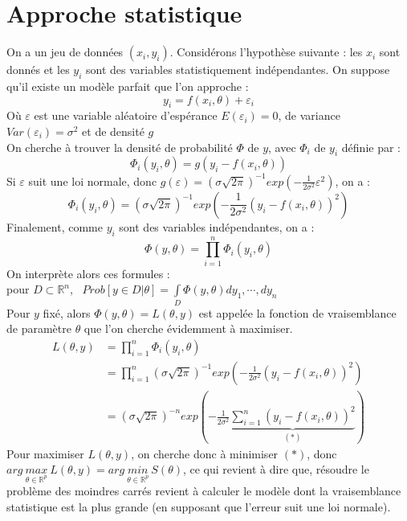 \documentclass[a4paper,10pt]{report}
\begin{document}
\section{Approche statistique}
On a un jeu de données $(x_i,y_i)$. Considérons l'hypothèse suivante : les $x_i$ sont donnés et les $y_i$ sont des variables statistiquement indépendantes. On suppose qu'il existe un modèle parfait que l'on approche :
\begin{displaymath}
y_i = f(x_i, \theta) + \varepsilon_i
\end{displaymath}
Où $\varepsilon$ est une variable aléatoire d'espérance $E(\varepsilon_i)=0$, de variance $Var(\varepsilon_i)=\sigma^2$ et de densité $g$\\
On cherche à trouver la densité de probabilité $\Phi$ de $y$, avec $\Phi_i$ de $y_i$  définie par :
\begin{displaymath}
\Phi_i(y_i, \theta)=g(y_i - f(x_i,\theta))
\end{displaymath}
Si $\varepsilon$ suit une loi normale, donc $g(\varepsilon)=(\sigma \sqrt{2\pi})^{-1}exp\left( -\frac{1}{2\sigma^2} \varepsilon^2 \right)$, on a :\\
\begin{displaymath}
\Phi_i(y_i, \theta)=(\sigma \sqrt{2\pi})^{-1}exp\left( -\frac{1}{2\sigma^2} (y_i - f(x_i,\theta))^2 \right)
\end{displaymath}
Finalement, comme $y_i$ sont des variables indépendantes, on a :
\begin{displaymath}
\Phi(y, \theta)=\prod \limits_{i=1}^n \Phi_i(y_i, \theta)
\end{displaymath}
On interprète alors ces formules :\\
pour $D \subset \mathbb{R}^n, \ \ \ Prob[y \in D | \theta]=\int \limits_D \Phi(y,\theta)dy_1,\cdots,dy_n$\\
Pour $y$ fixé, alors $\Phi(y,\theta)=L(\theta,y)$ est appelée la fonction de vraisemblance de paramètre $\theta$ que l'on cherche évidemment à maximiser.
\begin{align*}
L(\theta,y) & = \prod \limits_{i=1}^n \Phi_i(y_i, \theta) \\
			& = \prod \limits_{i=1}^n (\sigma \sqrt{2\pi})^{-1}exp\left( -\frac{1}{2\sigma^2} (y_i - f(x_i,\theta))^2 \right) \\
			& = (\sigma \sqrt{2\pi})^{-n}exp \left( -\frac{1}{2\sigma^2} \underbrace{\sum \limits_{i=1}^n(y_i - f(x_i,\theta))^2}_{(*)} \right)
\end{align*}
Pour maximiser $L(\theta,y)$, on cherche donc à minimiser $(*)$, donc $arg \ \underset{\theta \in \mathbb{R}^p}{max} \ L(\theta,y)=arg \ \underset{\theta \in \mathbb{R}^p}{min} \ S(\theta)$, ce qui revient à dire que, résoudre le problème des moindres carrés revient à calculer le modèle dont la vraisemblance statistique est la plus grande (en supposant que l'erreur suit une loi normale).
\end{document}
